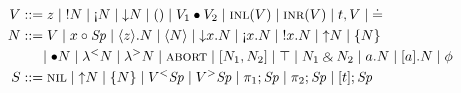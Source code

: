 \begin{align*}
V & ::= z                     %
   \mid \tbangr{N}            %
   \mid \tgnabr{N}            %
   \mid \tdownr{N}            %
%
   \mid \toner
   \mid \tfuser{V_1}{V_2}     %
%  
   \mid \tinl{V}
   \mid \tinr{V}
   \mid \texistsr{t}{V}
   \mid \tunifr
 \\
N & ::= \tfocusr{V}           %
   \mid \tfocusl{x}{\Sp}      %
   \mid \tetap{z}{N}          %
   \mid \tetan{N}             %
   \mid \tdownl{x}{N}         %
   \mid \tgnabl{x}{N}         %
   \mid \tbangl{x}{N}         %
   \mid \tupr{N}              %
   \mid \tlaxr{N}             %
\\ & ~~~~ %
   \mid \tfusel{N}            %
   \mid \tlaml{N}             %
   \mid \tlamr{N}             %
%
   \mid \tabort
   \mid \toplusl{N_1}{N_2}    %
   \mid \ttopr 
   \mid \twithr{N_1}{N_2}     %
   \mid \texistsl{a}{N}
   \mid \tforallr{a}{N}
   \mid \phi
\\
S & ::= \tnil                 %
   \mid \tupl{N}              %
   \mid \tlaxl{N}             %
   \mid \tappl{V}{\Sp}        %
   \mid \tappr{V}{\Sp}        %
   \mid \tpione{\Sp}          %
   \mid \tpitwo{\Sp}          %
   \mid \tforalll{t}{\Sp}
\end{align*}
